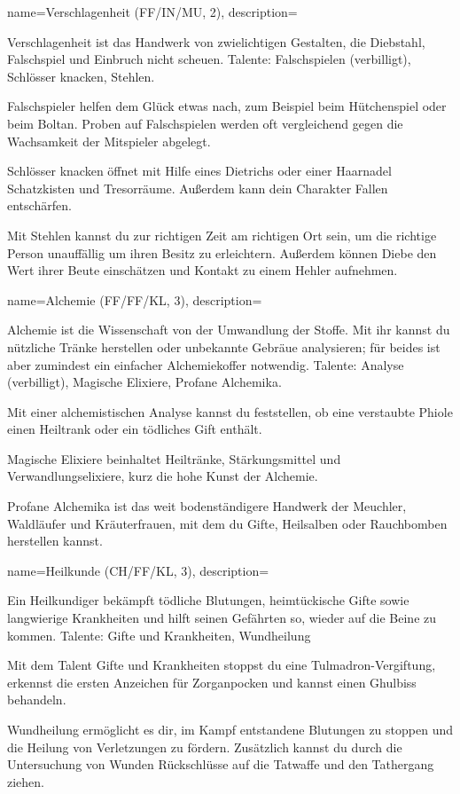 {
    name={Verschlagenheit (FF/IN/MU, 2)},
    description={Verschlagenheit ist das Handwerk von zwielichtigen Gestalten, die Diebstahl, Falschspiel und Einbruch nicht scheuen. Talente: Falschspielen (verbilligt), Schlösser knacken, Stehlen.
\begin{description}
\item Falschspieler helfen dem Glück etwas nach, zum Beispiel beim Hütchenspiel oder beim Boltan. Proben auf Falschspielen werden oft vergleichend gegen die Wachsamkeit der Mitspieler abgelegt.
\item Schlösser knacken öffnet mit Hilfe eines Dietrichs oder einer Haarnadel Schatzkisten und Tresorräume. Außerdem kann dein Charakter Fallen entschärfen.
\item Mit Stehlen kannst du zur richtigen Zeit am richtigen Ort sein, um die richtige Person unauffällig um ihren Besitz zu erleichtern. Außerdem können Diebe den Wert ihrer Beute einschätzen und Kontakt zu einem Hehler aufnehmen.
\end{description}}}

{
    name={Alchemie (FF/FF/KL, 3)},
    description={Alchemie ist die Wissenschaft von der Umwandlung der Stoffe. Mit ihr kannst du nützliche Tränke herstellen oder unbekannte Gebräue analysieren; für beides ist aber zumindest ein einfacher Alchemiekoffer notwendig. Talente: Analyse (verbilligt), Magische Elixiere, Profane Alchemika.
\begin{description}
\item Mit einer alchemistischen Analyse kannst du feststellen, ob eine verstaubte Phiole einen Heiltrank oder ein tödliches Gift enthält.
\item Magische Elixiere beinhaltet Heiltränke, Stärkungsmittel und Verwandlungselixiere, kurz die hohe Kunst der Alchemie.
\item Profane Alchemika ist das weit bodenständigere Handwerk der Meuchler, Waldläufer und Kräuterfrauen, mit dem du Gifte, Heilsalben oder Rauchbomben herstellen kannst.
\end{description}}}

{
    name={Heilkunde (CH/FF/KL, 3)},
    description={Ein Heilkundiger bekämpft tödliche Blutungen, heimtückische Gifte sowie langwierige Krankheiten und hilft seinen Gefährten so, wieder auf die Beine zu kommen. Talente: Gifte und Krankheiten, Wundheilung
\begin{description}
\item Mit dem Talent Gifte und Krankheiten stoppst du eine Tulmadron-Vergiftung, erkennst die ersten Anzeichen für Zorganpocken und kannst einen Ghulbiss behandeln.
\item Wundheilung ermöglicht es dir, im Kampf entstandene Blutungen zu stoppen und die Heilung von Verletzungen zu fördern. Zusätzlich kannst du durch die Untersuchung von Wunden Rückschlüsse auf die Tatwaffe und den Tathergang ziehen.
\end{description}}}

